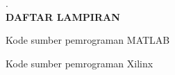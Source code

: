 \newpage %
\pagestyle{empty}


\centering
.\\
\vspace{5cm}
\LARGE\textbf{DAFTAR LAMPIRAN}\\
\vspace{1cm}

Kode sumber pemrograman MATLAB

Kode sumber pemrograman Xilinx
